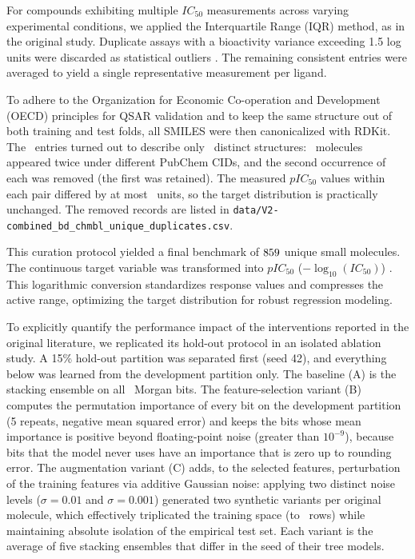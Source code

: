 For compounds exhibiting multiple $IC_{50}$ measurements across varying experimental conditions, we applied the Interquartile Range (IQR) method, as in the original study. Duplicate assays with a bioactivity variance exceeding 1.5 log units were discarded as statistical outliers \cite{karimova2025}. The remaining consistent entries were averaged to yield a single representative measurement per ligand. 

To adhere to the Organization for Economic Co-operation and Development (OECD) principles for QSAR validation \cite{tropsha2010, cherkasov2014, iwuala2025} and to keep the same structure out of both training and test folds, all SMILES were then canonicalized with RDKit. The \DataNAfterOutliers\ entries turned out to describe only \DataNMain\ distinct structures: \DataNDuplicatesRemoved\ molecules appeared twice under different PubChem CIDs, and the second occurrence of each was removed (the first was retained). The measured $pIC_{50}$ values within each pair differed by at most \DataDuplicateMaxSpread\ units, so the target distribution is practically unchanged. The removed records are listed in \texttt{data/V2-combined\_bd\_chmbl\_unique\_duplicates.csv}.

This curation protocol yielded a final benchmark of $859$ unique small molecules. The continuous target variable was transformed into $pIC_{50}$ ($-\log_{10}(IC_{50})$) \cite{karimova2025}. This logarithmic conversion standardizes response values and compresses the active range, optimizing the target distribution for robust regression modeling.

To explicitly quantify the performance impact of the interventions reported in the original literature, we replicated its hold-out protocol in an isolated ablation study. A 15\% hold-out partition was separated first (seed 42), and everything below was learned from the development partition only. The baseline (A) is the stacking ensemble on all \MorganNFeaturesTotal\ Morgan bits. The feature-selection variant (B) computes the permutation importance of every bit on the development partition (5 repeats, negative mean squared error) and keeps the bits whose mean importance is positive beyond floating-point noise (greater than $10^{-9}$), because bits that the model never uses have an importance that is zero up to rounding error. The augmentation variant (C) adds, to the selected features, perturbation of the training features via additive Gaussian noise: applying two distinct noise levels ($\sigma = 0.01$ and $\sigma = 0.001$) generated two synthetic variants per original molecule, which effectively triplicated the training space (to \ExpCAugSizeTrain\ rows) while maintaining absolute isolation of the empirical test set. Each variant is the average of five stacking ensembles that differ in the seed of their tree models.

